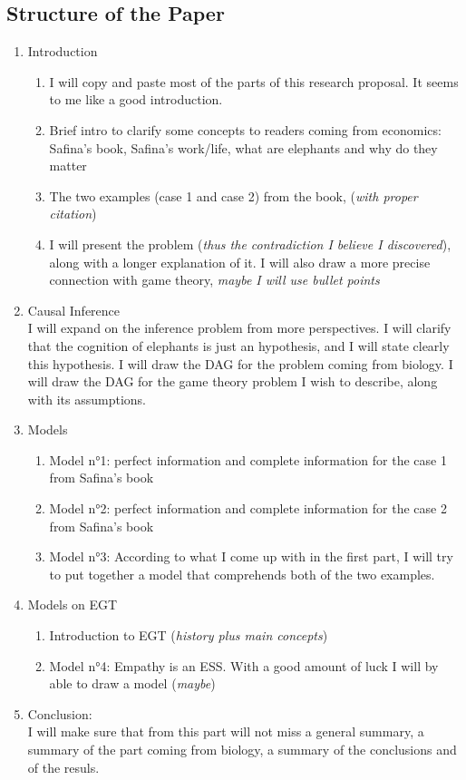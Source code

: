 \newpage
\subsection{Structure of the Paper}
\begin{enumerate}
    \item Introduction
        \begin{enumerate}
            \item I will copy and paste most of the parts of this research proposal. It seems to me like a good introduction.
            \item Brief intro to clarify some concepts to readers coming from economics: Safina's book, Safina's work/life, what are elephants and why do they matter
            \item The two examples (case 1 and case 2) from the book, (\textit{with proper citation})
            \item I will present the problem (\textit{thus the contradiction I believe I discovered}), along with a longer explanation of it. I will also draw a more precise connection with game theory, \textit{maybe I will use bullet points}
        \end{enumerate}
    \item Causal Inference \\ I will expand on the inference problem from more perspectives. I will clarify that the cognition of elephants is just an hypothesis, and I will state clearly this hypothesis. I will draw the DAG for the problem coming from biology. I will draw the DAG for the game theory problem I wish to describe, along with its assumptions.
    \item Models
        \begin{enumerate}
            \item Model n°1: perfect information and complete information for the case 1 from Safina's book
            \item Model n°2: perfect information and complete information for the case 2 from Safina's book
            \item Model n°3: According to what I come up with in the first part, I will try to put together a model that comprehends both of the two examples.
        \end{enumerate}
    \item Models on EGT
        \begin{enumerate}
            \item Introduction to EGT (\textit{history plus main concepts})
            \item Model n°4: Empathy is an ESS. With a good amount of luck I will by able to draw a model (\textit{maybe})
        \end{enumerate}
    \item Conclusion:\\I will make sure that from this part will not miss a general summary, a summary of the part coming from biology, a summary of the conclusions and of the resuls.
\end{enumerate}